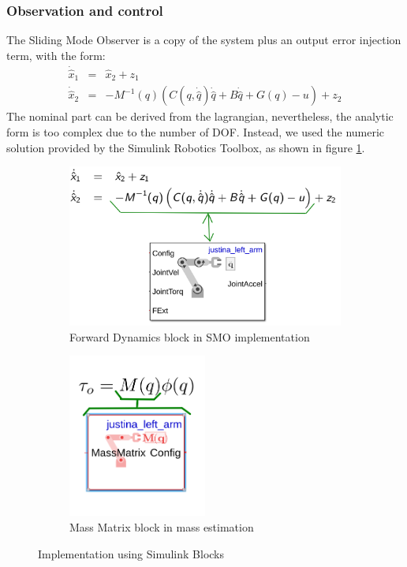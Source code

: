 \documentclass[a4paper, 10pt]{article}
\begin{document}
\subsubsection*{Observation and control}
The Sliding Mode Observer is a copy of the system plus an output error injection term, with the form:
\begin{eqnarray}
  \dot{\hat{x}}_1 &=& \hat{x}_2 + z_1\label{eq:observer1}\\
  \dot{\hat{x}}_2 &=& -M^{-1}(q)\left(C(q, \dot{\hat{q}})\dot{\hat{q}} + B\dot{\hat{q}} + G(q) - u\right) + z_2\label{eq:observer2}
\end{eqnarray}
  The nominal part can be derived from the lagrangian, nevertheless, the analytic form is too complex due to the number of DOF. Instead, we used the numeric solution provided by the Simulink Robotics Toolbox, as shown in figure \ref{fig:SimulinkSMO}.
\begin{figure}
  \centering
  \begin{subfigure}{0.45\textwidth}
  \centering
  \includegraphics[width=\textwidth]{Figures/SMOwithSimulink.png}
  \caption{Forward Dynamics block in SMO implementation}
  \label{fig:SimulinkSMO}
  \end{subfigure}
  \begin{subfigure}{0.45\textwidth}
  \centering
  \includegraphics[width=0.5\textwidth]{Figures/MassEst.png}
  \caption{Mass Matrix block in mass estimation}
  \label{fig:SimulinkMassEst}
  \end{subfigure}
  \caption{Implementation using Simulink Blocks}
\end{figure}
  
\end{document}
